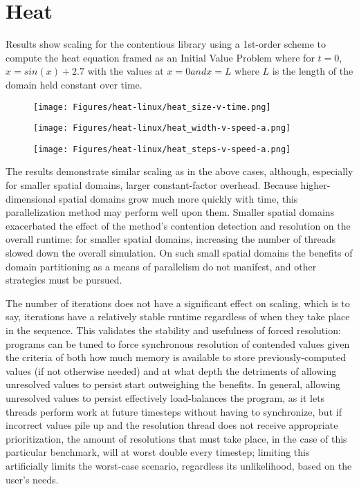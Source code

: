 \section{Heat}
Results show scaling for the contentious library using a 1st-order scheme to
compute the heat equation framed as an Initial Value Problem where for $t=0$,
$x = sin(x) + 2.7$ with the values at $x=0 and x=L$ where $L$ is the length of
the domain held constant over time.

\begin{figure}[!h]
\centering
    \texttt{[image: Figures/heat-linux/heat\_size-v-time.png]}
\end{figure}
\begin{figure}[!h]
\centering
    \texttt{[image: Figures/heat-linux/heat\_width-v-speed-a.png]}
\end{figure}
\begin{figure}[!h]
\centering
    \texttt{[image: Figures/heat-linux/heat\_steps-v-speed-a.png]}
\end{figure}

The results demonstrate similar scaling as in the above cases, although,
especially for smaller spatial domains, larger constant-factor overhead. Because
higher-dimensional spatial domains grow much more quickly with time, this
parallelization method may perform well upon them. Smaller spatial domains
exacerbated the effect of the method's contention detection and resolution on
the overall runtime: for smaller spatial domains, increasing the number of
threads slowed down the overall simulation. On such small spatial domains the
benefits of domain partitioning as a means of parallelism do not manifest, and
other strategies must be pursued.

The number of iterations does not have a significant effect on scaling, which is
to say, iterations have a relatively stable runtime regardless of when they take
place in the sequence. This validates the stability and usefulness of forced
resolution: programs can be tuned to force synchronous resolution of contended
values given the criteria of both how much memory is available to store
previously-computed values (if not otherwise needed) and at what depth the
detriments of allowing unresolved values to persist start outweighing the
benefits. In general, allowing unresolved values to persist effectively
load-balances the program, as it lets threads perform work at future timesteps
without having to synchronize, but if incorrect values pile up and the
resolution thread does not receive appropriate prioritization, the amount of
resolutions that must take place, in the case of this particular benchmark, will
at worst double every timestep; limiting this artificially limits the
worst-case scenario, regardless its unlikelihood, based on the user's needs.

